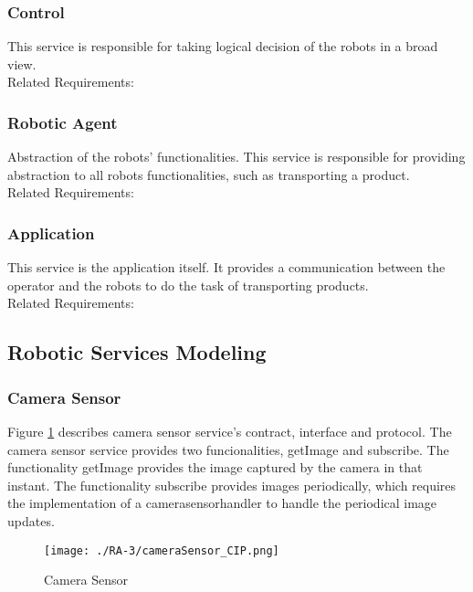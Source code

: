 \subsubsection*{Control}
This service is responsible for taking logical decision of the robots in a broad view.
\\Related Requirements:

\subsubsection*{Robotic Agent}
Abstraction of the robots' functionalities. This service is responsible for providing abstraction to all robots functionalities, such as transporting a product.%
\\Related Requirements:

\subsubsection*{Application}
This service is the application itself. It provides a communication between the operator and the robots to do the task of transporting products.
\\Related Requirements:

\subsection{Robotic Services Modeling}
\subsubsection{Camera Sensor} %
Figure \ref{fig:camerasensor_cip} describes camera sensor service's contract, interface and protocol. The camera sensor service provides two funcionalities, getImage and subscribe. The functionality getImage provides the image captured by the camera in that instant. The functionality subscribe provides images periodically, which requires the implementation of a camerasensorhandler to handle the periodical image updates.
\begin{figure}[ht!]
 \centering
 \texttt{[image: ./RA-3/cameraSensor\_CIP.png]}
 \caption{Camera Sensor}
 \label{fig:camerasensor_cip}
\end{figure}


